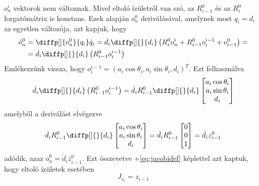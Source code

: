 \documentclass[12pt,a4paper]{report}
\theoremstyle{remark}
\theoremstyle{definition}
\begin{document}
$o^{i}_{n}$ vektorok nem változnak. Mivel eltoló ízületről van szó, az $R^{0}_{i-1}$ és az $R^{0}_{i}$ forgatómátrix 
is konstans. Ezek alapján $o^{0}_{n}$ deriválásával, amelynek most $q_i = d_i$ az egyetlen változója, azt kapjuk, 
hogy
\begin{equation}
\begin{aligned}
\dot{o}^{0}_{n} &= \diffp[]{o^{0}_{n}}{q_i} \dot{q}_i
= \dot{d}_i \diffp[]{}{d_i} \left( R^{0}_{i}o^{i}_{n} + R^{0}_{i-1}o^{i-1}_{i} + o^{0}_{i-1} \right) = \\
    &= \dot{d}_i \diffp[]{}{d_i} \left( R^{0}_{i-1}o^{i-1}_{i} \right)
\end{aligned}
\end{equation}
Emlékezzünk vissza, hogy $o^{i-1}_{i} = (a_i \cos \theta_i, a_i \sin \theta_i, d_i)^T$. Ezt felhasználva
\begin{equation}
\dot{d}_i \diffp[]{}{d_i} \left( R^{0}_{i-1}o^{i-1}_{i} \right) = \dot{d}_i R^{0}_{i-1} \diffp[]{}{d_i} 
        \begin{bmatrix}
        a_i \cos \theta_i \\ 
        a_i \sin \theta_i \\ 
        d_i
        \end{bmatrix}
\end{equation}
amelyből a deriválást elvégezve
\begin{equation}
\dot{d}_i R^{0}_{i-1} \diffp[]{}{d_i} 
    \begin{bmatrix}
    a_i \cos \theta_i \\ 
    a_i \sin \theta_i \\ 
    d_i
    \end{bmatrix} = 
\dot{d}_i R^{0}_{i-1}
    \begin{bmatrix}
    0 \\ 
    0 \\ 
    1
    \end{bmatrix} = \dot{d}_i z^{0}_{i-1}
\end{equation}
adódik, azaz $\dot{o}^{0}_{n} = \dot{d}_i z^{0}_{i-1}$. Ezt összevetve \az+\eqref{eq:jacobidef} képlettel azt 
kaptuk, hogy eltoló ízületek esetében
\begin{equation}
J_{v_{i}} = z_{i-1}
\end{equation}
\end{document}
